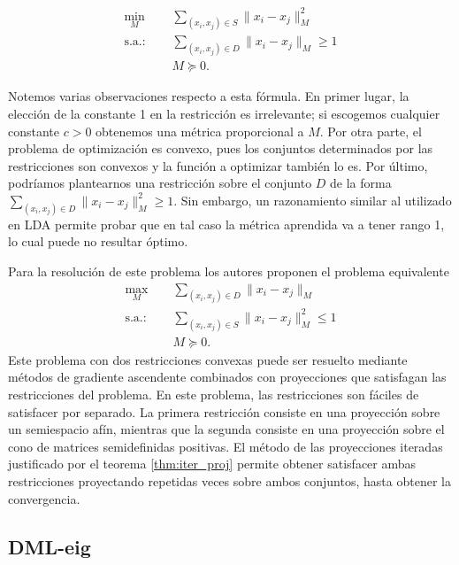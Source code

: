 \documentclass{book}
\begin{document}
\begin{equation} \label{eq:lsi}
\begin{split}
	\min_{M} &\quad \sum_{(x_i,x_j)\in S}  \|x_i - x_j \|_M^2 \\
	\text{s.a.: } &\quad \sum_{(x_i,x_j) \in D} \|x_i - x_j\|_M \ge 1 \\
				  &\quad M \succeq 0.
\end{split}
\end{equation}

Notemos varias observaciones respecto a esta fórmula. En primer lugar, la elección de la constante 1 en la restricción es irrelevante; si escogemos cualquier constante $c > 0$ obtenemos una métrica proporcional a $M$. Por otra parte, el problema de optimización es convexo, pues los conjuntos determinados por las restricciones son convexos y la función a optimizar también lo es. Por último, podríamos plantearnos una restricción sobre el conjunto $D$ de la forma $\sum_{(x_i,x_j) \in D} \|x_i - x_j\|_M^2 \ge 1$. Sin embargo, un razonamiento similar al utilizado en LDA permite probar que en tal caso la métrica aprendida va a tener rango 1, lo cual puede no resultar óptimo.

Para la resolución de este problema los autores proponen el problema equivalente
\begin{equation} \label{eq:lsi:equiv}
\begin{split}
	\max_{M} &\quad \sum_{(x_i,x_j)\in D}  \|x_i - x_j \|_M \\
	\text{s.a.: } &\quad \sum_{(x_i,x_j) \in S} \|x_i - x_j\|_M^2 \le 1 \\
				  &\quad M \succeq 0.
\end{split}
\end{equation}
Este problema con dos restricciones convexas puede ser resuelto mediante métodos de gradiente ascendente combinados con proyecciones que satisfagan las restricciones del problema. En este problema, las restricciones son fáciles de satisfacer por separado. La primera restricción consiste en una proyección sobre un semiespacio afín, mientras que la segunda consiste en una proyección sobre el cono de matrices semidefinidas positivas. El método de las proyecciones iteradas justificado por el teorema \ref{thm:iter_proj} permite obtener satisfacer ambas restricciones proyectando repetidas veces sobre ambos conjuntos, hasta obtener la convergencia.

\subsection{DML-eig}
\end{document}
